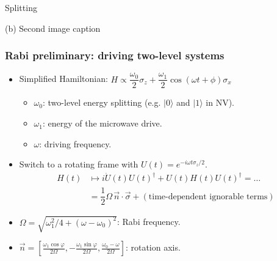 \begin{frame}{Splitting}
\begin{minipage}{0.48\textwidth}
        {\small(b) Second image caption}
    \end{minipage}
\end{frame}

\begin{frame}
    \frametitle{Rabi preliminary: driving two-level systems}
    \begin{itemize}
        \item Simplified Hamiltonian: $H \propto \dfrac{\omega_0}{2} \sigma_z + \dfrac{\omega_1}{2} \cos(\omega t + \phi) \sigma_x$
        \begin{itemize}
            \item $\omega_0$: two-level energy splitting (e.g. $|0\rangle$ and $|1\rangle$ in NV). 
            \item $\omega_1$: energy of the microwave drive. 
            \item $\omega$: driving frequency. 
        \end{itemize}

        \item Switch to a rotating frame with $U(t) = e^{-i\omega t \sigma_z/2}$. 
        \begin{align*}
            H(t) 
            &\mapsto i \dot U(t)U(t)^\dag + U(t) H(t) U(t)^\dag = \dots \\ 
            &= \dfrac 1 2 \Omega \, \vec n\cdot \vec \sigma + (\text{time-dependent ignorable terms})
        \end{align*}
        \item $\Omega = \sqrt{\omega_1^2/4 + (\omega - \omega_0)^2}$: Rabi frequency. 
        \item $\vec{n} = \left[\frac{\omega_1 \cos \varphi}{2\Omega}, -\frac{\omega_1 \sin \varphi}{2\Omega}, \frac{\omega_0-\omega}{2\Omega}\right]$: rotation axis. 
    \end{itemize}
\end{frame}

